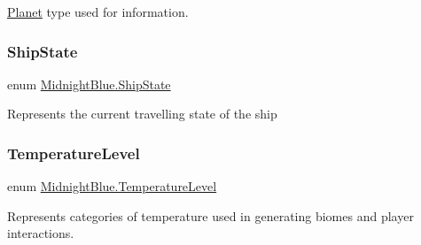 \hyperlink{class_midnight_blue_1_1_planet}{Planet} type used for information. 

\hypertarget{namespace_midnight_blue_a46fd3250d826e0dec67892328d5b368c}{}\label{namespace_midnight_blue_a46fd3250d826e0dec67892328d5b368c} 
\subsubsection{\texorpdfstring{Ship\+State}{ShipState}}
{\footnotesize\ttfamily enum \hyperlink{namespace_midnight_blue_a46fd3250d826e0dec67892328d5b368c}{Midnight\+Blue.\+Ship\+State}\hspace{0.3cm}{\ttfamily [strong]}}



Represents the current travelling state of the ship 

\hypertarget{namespace_midnight_blue_a6ea6484178cbe707f25d1a0ed56db7ab}{}\label{namespace_midnight_blue_a6ea6484178cbe707f25d1a0ed56db7ab} 
\subsubsection{\texorpdfstring{Temperature\+Level}{TemperatureLevel}}
{\footnotesize\ttfamily enum \hyperlink{namespace_midnight_blue_a6ea6484178cbe707f25d1a0ed56db7ab}{Midnight\+Blue.\+Temperature\+Level}\hspace{0.3cm}{\ttfamily [strong]}}



Represents categories of temperature used in generating biomes and player interactions. 

